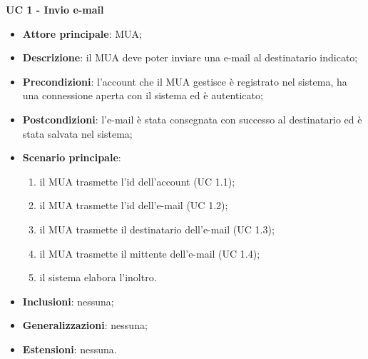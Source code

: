         \begin{tcolorbox}
            \textbf{{\Large UC 1 - Invio e-mail}}
    
            \begin{itemize}
                \item \textbf{Attore principale}: MUA;
                \item \textbf{Descrizione}: il MUA deve poter inviare una e-mail al destinatario indicato;
                \item \textbf{Precondizioni}: l’account che il MUA gestisce è registrato nel sistema, ha una connessione aperta con il sistema ed è autenticato;
                \item \textbf{Postcondizioni}: l'e-mail è stata consegnata con successo al destinatario ed è stata salvata nel sistema;
                \item \textbf{Scenario principale}:
                    \begin{enumerate}
                        \item il MUA trasmette l'id dell'account (UC 1.1);
                        \item il MUA trasmette l'id dell'e-mail (UC 1.2);
                        \item il MUA trasmette il destinatario dell'e-mail (UC 1.3);
                        \item il MUA trasmette il mittente dell'e-mail (UC 1.4);
                        \item il sistema elabora l'inoltro.
                    \end{enumerate}
                \item \textbf{Inclusioni}: nessuna;
                \item \textbf{Generalizzazioni}: nessuna;
                \item \textbf{Estensioni}: nessuna.
            \end{itemize}
        \end{tcolorbox}

    \clearpage
